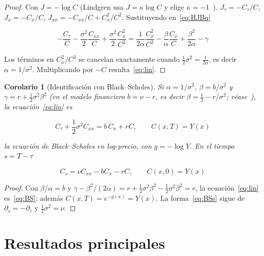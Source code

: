 \documentclass[11pt,letterpaper]{article}
\theoremstyle{plain}
\newtheorem{corolario}[theorem]{Corolario}
\theoremstyle{definition}
\theoremstyle{remark}
\numberwithin{equation}{section}
\begin{document}
	\begin{proof}
		Con \(J=-\log C\) (Lindgren usa \(J=\kappa\log C\) y elige \(\kappa=-1\)~\cite[ec.~(14)--(15)]{Lindgren2020}). \(J_\tau=-C_\tau/C\), \(J_x=-C_x/C\), \(J_{xx}=-C_{xx}/C+C_x^2/C^2\). Sustituyendo en~\eqref{eq:HJBq}
		
		\[
		-\frac{C_\tau}{C}-\frac{\sigma^2}{2}\frac{C_{xx}}{C}+\frac{\sigma^2}{2}\frac{C_x^2}{C^2} =\frac{1}{2\alpha}\frac{C_x^2}{C^2}-\frac{\beta}{\alpha}\frac{C_x}{C}+\frac{\beta^2}{2\alpha}-\gamma
		\]
		
		Los términos en \(C_x^2/C^2\) se cancelan exactamente cuando \(\frac12\sigma^2=\frac1{2\alpha}\), es decir \(\alpha=1/\sigma^2\). Multiplicando por \(-C\) resulta~\eqref{eq:lin}.
		
		
	\end{proof}
	
	\begin{corolario}[Identificación con Black--Scholes]\label{cor:BS}
		Si \(\alpha=1/\sigma^2\), \(\beta=b/\sigma^2\) y \(\gamma=r+\frac12\sigma^2\beta^2\) (en el modelo financiero \(b=\nu-r\), es decir \(\beta=\frac12-r/\sigma^2\); véase~\cite[Sec.~2.3, ec.~(16)--(18)]{Lindgren2020}), la ecuación~\eqref{eq:lin} es
		
		\begin{equation}\label{eq:BS}
			C_\tau+\frac12\sigma^2C_{xx}=b\,C_x+rC,\qquad C(x,T)=Y(x)
		\end{equation}
		
		la ecuación de Black--Scholes en log-precio, con \(g=-\log Y\). En el tiempo \(s=T-\tau\)
		
		\begin{equation}\label{eq:BSs}
			C_s=\nu C_{xx}-bC_x-rC,\qquad C(x,0)=Y(x)
		\end{equation}
	\end{corolario}
	
	\begin{proof}
		Con \(\beta/\alpha=b\) y \(\gamma-\beta^2/(2\alpha)=r+\frac12\sigma^2\beta^2-\frac12\sigma^2\beta^2=r\), la ecuación~\eqref{eq:lin} es~\eqref{eq:BS}; además \(C(x,T)=e^{-g(x)}=Y(x)\). La forma~\eqref{eq:BSs} sigue de \(\partial_s=-\partial_\tau\) y \(\tfrac12\sigma^2=\nu\).
	\end{proof}
	
	\section{Resultados principales}\label{sec:principal}
	
\end{document}
